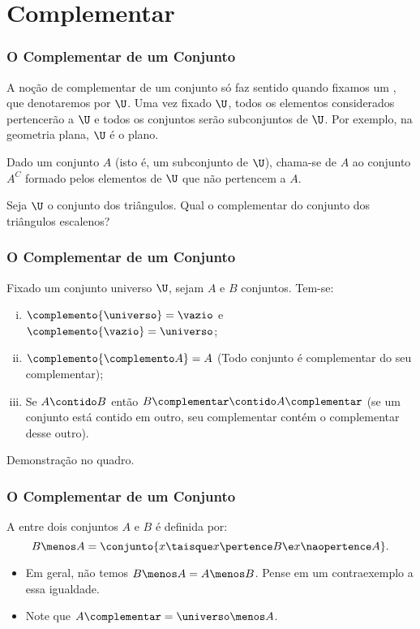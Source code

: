 \section{Complementar}


\begin{frame}
	\frametitle{O Complementar de um Conjunto}

	A noção de complementar de um conjunto só faz sentido quando fixamos um , que denotaremos por $\U$. Uma vez fixado $\U$, todos os elementos considerados pertencerão a $\U$ e todos os conjuntos serão subconjuntos de $\U$. Por exemplo, na geometria plana, $\U$ é o plano.

	\begin{definicao}
		Dado um conjunto $A$ (isto é, um subconjunto de $\U$), chama-se  de $A$ ao conjunto $A^C$ formado pelos elementos de $\U$ que não pertencem a $A$.
	\end{definicao}

	\begin{exemplo}
		Seja $\U$ o conjunto dos triângulos. Qual o complementar do conjunto dos triângulos escalenos?
	\end{exemplo}
\end{frame}


\begin{frame}
	\frametitle{O Complementar de um Conjunto}

	\begin{proposicao}
		\label{prop-comp}
		Fixado um conjunto universo $\U$, sejam $A$ e $B$ conjuntos. Tem-se:
		\begin{enumerate}[i.]
			\item $\complemento{\universo} = \vazio$ e $\complemento{\vazio} = \universo$;
			\item $\complemento{\complemento A} = A$ (Todo conjunto é complementar do seu complementar);
			\item Se $A \contido B$ então $B\complementar \contido A\complementar$ (se um conjunto está contido em outro, seu complementar contém o complementar desse outro).
		\end{enumerate}
	\end{proposicao}

	Demonstração no quadro.
\end{frame}


\begin{frame}
	\frametitle{O Complementar de um Conjunto}

	\begin{definicao}
		A  entre dois conjuntos $A$ e $B$ é definida por:
		\[
			B \menos A = \conjunto { x \taisque x \pertence B \e x \naopertence A}.
		\]
	\end{definicao}

	\begin{itemize}
		\item Em geral, não temos $B \menos A = A \menos B$. Pense em um contraexemplo a essa igualdade.
		\item Note que $A\complementar = \universo \menos A$.
	\end{itemize}
\end{frame}